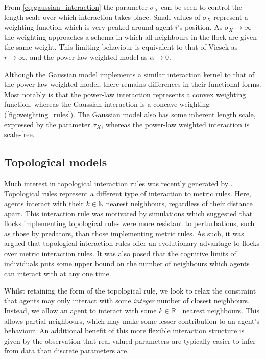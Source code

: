 From \cref{eq:gaussian_interaction} the parameter $\sigma_X$ can be seen to control the
length-scale over which interaction takes place. Small values of $\sigma_X$ represent a
weighting function which is very peaked around agent $i$'s position. As $\sigma_X
\rightarrow \infty$ the weighting approaches a schema in which all neighbours in the flock
are given the same weight. This limiting behaviour is equivalent to that of Vicsek as
$r\rightarrow\infty$, and the power-law weighted model as $\alpha\rightarrow0$.

Although the Gaussian model implements a similar interaction kernel to that of the
power-law weighted model, there remains differences in their functional forms.  Most
notably is that the power-law interaction represents a convex weighting function, whereas
the Gaussian interaction is a concave weighting (\cref{fig:weighting_rules}). The Gaussian
model also has some inherent length scale, expressed by the parameter $\sigma_X$, whereas
the power-law weighted interaction is scale-free.

\subsection{Topological models}

Much interest in topological interaction rules was recently generated by
\cite{ballerini08}. Topological rules represent a different type of interaction to metric
rules. Here, agents interact with their $k\in\mathbb{N}$ nearest neighbours, regardless of
their distance apart. This interaction rule was motivated by simulations which suggested
that flocks implementing topological rules were more resistant to perturbations, such as
those by predators, than those implementing metric rules. As such, it was argued that
topological interaction rules offer an evolutionary advantage to flocks over metric
interaction rules. It was also posed that the cognitive limits of individuals puts some
upper bound on the number of neighbours which agents can interact with at any one time.

Whilst retaining the form of the topological rule, we look to relax the constraint that
agents may only interact with some \emph{integer} number of closest neighbours. Instead,
we allow an agent to interact with some $k\in\mathbb{R}^+$ nearest neighbours. This
allows partial neighbours, which may make some lesser contribution to an agent's
behaviour. An additional benefit of this more flexible interaction structure is given by
the observation that real-valued parameters are typically easier to infer from data than
discrete parameters are.

